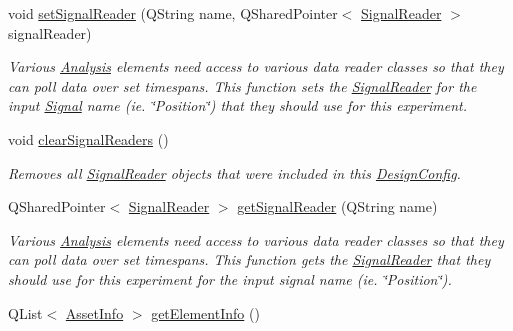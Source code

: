 \begin{DoxyCompactItemize}
void \hyperlink{class_picto_1_1_design_config_ae70b1320a758c21dd330184ba6dfab38}{set\-Signal\-Reader} (Q\-String name, Q\-Shared\-Pointer$<$ \hyperlink{class_picto_1_1_signal_reader}{Signal\-Reader} $>$ signal\-Reader)
\begin{DoxyCompactList}\small\item\em Various \hyperlink{class_picto_1_1_analysis}{Analysis} elements need access to various data reader classes so that they can poll data over set timespans. This function sets the \hyperlink{class_picto_1_1_signal_reader}{Signal\-Reader} for the input \hyperlink{class_picto_1_1_signal}{Signal} name (ie. \char`\"{}\-Position\char`\"{}) that they should use for this experiment. \end{DoxyCompactList}\item 
\hypertarget{class_picto_1_1_design_config_a49706444d1f1c9e0e3d82edc376dad28}{void \hyperlink{class_picto_1_1_design_config_a49706444d1f1c9e0e3d82edc376dad28}{clear\-Signal\-Readers} ()}\label{class_picto_1_1_design_config_a49706444d1f1c9e0e3d82edc376dad28}

\begin{DoxyCompactList}\small\item\em Removes all \hyperlink{class_picto_1_1_signal_reader}{Signal\-Reader} objects that were included in this \hyperlink{class_picto_1_1_design_config}{Design\-Config}. \end{DoxyCompactList}\item 
Q\-Shared\-Pointer$<$ \hyperlink{class_picto_1_1_signal_reader}{Signal\-Reader} $>$ \hyperlink{class_picto_1_1_design_config_a0f4bedf67fa6c051dc10a7190e55ed66}{get\-Signal\-Reader} (Q\-String name)
\begin{DoxyCompactList}\small\item\em Various \hyperlink{class_picto_1_1_analysis}{Analysis} elements need access to various data reader classes so that they can poll data over set timespans. This function gets the \hyperlink{class_picto_1_1_signal_reader}{Signal\-Reader} that they should use for this experiment for the input signal name (ie. \char`\"{}\-Position\char`\"{}). \end{DoxyCompactList}\item 
\hypertarget{class_picto_1_1_design_config_aa6c7eb2eaefa7e433dbd683f67003834}{Q\-List$<$ \hyperlink{struct_picto_1_1_asset_info}{Asset\-Info} $>$ \hyperlink{class_picto_1_1_design_config_aa6c7eb2eaefa7e433dbd683f67003834}{get\-Element\-Info} ()}\label{class_picto_1_1_design_config_aa6c7eb2eaefa7e433dbd683f67003834}


\end{DoxyCompactItemize}
